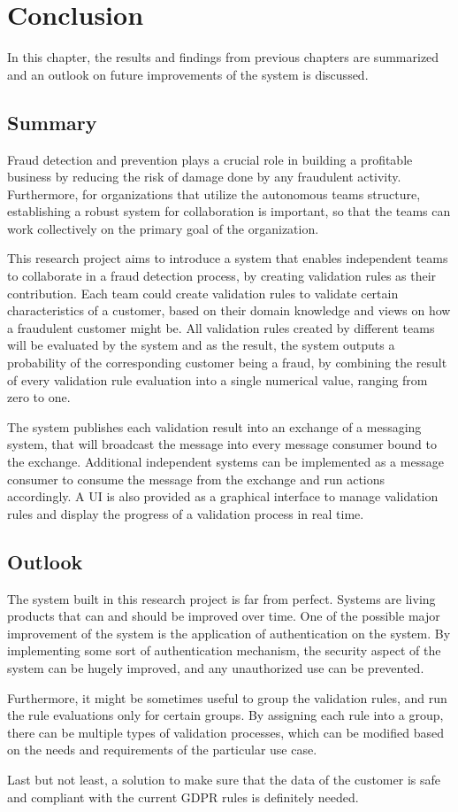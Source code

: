 \chapter{Conclusion}

  In this chapter, the results and findings from previous chapters are summarized and an outlook on future improvements of the system is discussed.

  \section{Summary}

    Fraud detection and prevention plays a crucial role in building a profitable business by reducing the risk of damage done by any fraudulent activity. Furthermore, for organizations that utilize the autonomous teams structure, establishing a robust system for collaboration is important, so that the teams can work collectively on the primary goal of the organization.

    This research project aims to introduce a system that enables independent teams to collaborate in a fraud detection process, by creating validation rules as their contribution. Each team could create validation rules to validate certain characteristics of a customer, based on their domain knowledge and views on how a fraudulent customer might be. All validation rules created by different teams will be evaluated by the system and as the result, the system outputs a probability of the corresponding customer being a fraud, by combining the result of every validation rule evaluation into a single numerical value, ranging from zero to one. 
    
    The system publishes each validation result into an exchange of a messaging system, that will broadcast the message into every message consumer bound to the exchange. Additional independent systems can be implemented as a message consumer to consume the message from the exchange and run actions accordingly. A UI is also provided as a  graphical interface to manage validation rules and display the progress of a validation process in real time. 
  
  \section{Outlook}

    The system built in this research project is far from perfect. Systems are living products that can and should be improved over time. One of the possible major improvement of the system is the application of authentication on the system. By implementing some sort of authentication mechanism, the security aspect of the system can be hugely improved, and any unauthorized use can be prevented. 

    Furthermore, it might be sometimes useful to group the validation rules, and run the rule evaluations only for certain groups. By assigning each rule into a group, there can be multiple types of validation processes, which can be modified based on the needs and requirements of the particular use case.
    
    Last but not least, a solution to make sure that the data of the customer is safe and compliant with the current GDPR rules is definitely needed. 